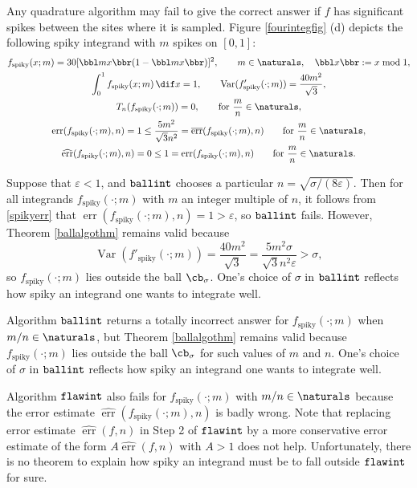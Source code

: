 \documentclass[]{article}
\DeclareMathOperator{\flawinteg}{\texttt{\textup{flawint}}}
\DeclareMathOperator{\ballinteg}{\texttt{\textup{ballint}}}
\DeclareMathOperator{\Var}{Var}
\DeclareMathOperator{\err}{err}
\newcommand{\oerr}{\overline{\err}}
\newcommand{\herr}{\widehat{\err}}
\theoremstyle{definition}
\theoremstyle{remark}
\begin{document}
Any quadrature algorithm may fail to give the correct answer if $f$ has significant spikes between the sites where it is sampled.  Figure \ref{fourintegfig} (d) depicts the following spiky integrand with $m$ spikes on $[0,1]$:
\begin{subequations} \label{spiky}
\begin{gather}
f_{\text{spiky}}(x;m) = 30[\bbl m x \bbr(1-\bbl m x \bbr)]^2, \qquad m \in \naturals, \quad \bbl x \bbr := x \bmod 1, \\
\int_0^1 f_{\text{spiky}}(x;m) \, \dif x = 1, \qquad \Var(f'_{\text{spiky}}(\cdot;m))= \frac{40m^2}{\sqrt{3}},\\
T_n(f_{\text{spiky}}(\cdot;m))=0, \qquad 
\text{for } \frac{m} {n} \in \naturals, \\
\label{spikyerr}
\err(f_{\text{spiky}}(\cdot;m),n)=1 \le \frac{5m^2}{\sqrt{3}n^2} = \oerr(f_{\text{spiky}}(\cdot;m),n) \qquad 
\text{for } \frac{m}{n} \in \naturals, \\
\label{spikyerrest}
\herr(f_{\text{spiky}}(\cdot;m),n)=0 \le 1 =  \err(f_{\text{spiky}}(\cdot;m),n) \qquad 
\text{for } \frac{m}{n} \in \naturals.
\end{gather}
\end{subequations}

Suppose that $\varepsilon<1$, and $\ballinteg$ chooses a particular $n=\sqrt{\sigma/(8\varepsilon)}$.  Then for all integrands $f_{\text{spiky}}(\cdot;m)$ with $m$ an integer multiple of $n$, it follows from \eqref{spikyerr} that $\err(f_{\text{spiky}}(\cdot;m),n)=1 > \varepsilon$, so $\ballinteg$ fails.  However, Theorem \ref{ballalgothm} remains valid because 
\[
\Var(f'_{\text{spiky}}(\cdot;m))= \frac{40m^2}{\sqrt{3}} = \frac{5m^2\sigma }{\sqrt{3}n^2 \varepsilon} > \sigma,
\]
so $f_{\text{spiky}}(\cdot;m)$ lies outside the ball $\cb_{\sigma}$.  One's choice of $\sigma$ in $\ballinteg$ reflects how spiky an integrand one wants to integrate well.

Algorithm $\ballinteg$ returns a totally incorrect answer for $f_{\text{spiky}}(\cdot;m)$ when $m/n \in \naturals$, but Theorem \ref{ballalgothm} remains valid because $f_{\text{spiky}}(\cdot;m)$ lies outside the ball $\cb_{\sigma}$ for such values of $m$ and $n$.  One's choice of $\sigma$ in $\ballinteg$ reflects how spiky an integrand one wants to integrate well.

Algorithm $\flawinteg$ also fails for $f_{\text{spiky}}(\cdot;m)$ with $m/n \in \naturals$ because the error estimate $\herr(f_{\text{spiky}}(\cdot;m),n)$ is badly wrong. Note that replacing error estimate $\herr(f,n)$ in Step 2 of $\flawinteg$ by a more conservative error estimate of the form $A\herr(f,n)$ with $A>1$ does not help. Unfortunately, there is no theorem to explain how spiky an integrand must be to fall outside $\flawinteg$ for sure.
\end{document}
